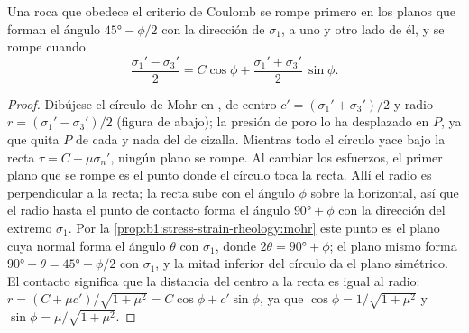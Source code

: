 \begin{theorem}\label{thm:b1:stress-strain-rheology:failure-angle}
Una roca que obedece el criterio de Coulomb se rompe primero en los planos que forman el ángulo $\ang{45} - \phi/2$ con la dirección de $\sigma_1$, a uno y otro
lado de él, y se rompe cuando
\[
  \frac{\sigma_1' - \sigma_3'}{2} = C\cos\phi + \frac{\sigma_1' + \sigma_3'}{2}\,\sin\phi .
\]
\end{theorem}

\begin{proof}
Dibújese el círculo de Mohr en , de centro $c' =
(\sigma_1'+\sigma_3')/2$ y radio $r = (\sigma_1'-\sigma_3')/2$ (figura de abajo); la presión de poro lo ha desplazado en
$P$, ya que quita $P$ de cada  y nada del de cizalla. Mientras todo el círculo yace bajo la recta $\tau = C + \mu\sigma_n'$,
ningún plano se rompe. Al cambiar los esfuerzos, el primer plano que se rompe es el punto donde el círculo toca la recta. Allí el radio es perpendicular a la
recta; la recta sube con el ángulo $\phi$ sobre la horizontal, así que el radio hasta el punto de contacto forma el ángulo $\ang{90} + \phi$ con la dirección del
extremo $\sigma_1$. Por la \cref{prop:b1:stress-strain-rheology:mohr} este punto es el plano cuya normal forma el ángulo $\theta$ con $\sigma_1$, donde
$2\theta = \ang{90} + \phi$; el plano mismo forma $\ang{90} - \theta = \ang{45} - \phi/2$ con $\sigma_1$, y la mitad inferior del círculo da el plano simétrico. El
contacto significa que la distancia del centro a la recta es igual al radio: $r = (C + \mu c')/\sqrt{1+\mu^2} = C\cos\phi + c'\sin\phi$, ya que
$\cos\phi = 1/\sqrt{1+\mu^2}$ y $\sin\phi = \mu/\sqrt{1+\mu^2}$.
\end{proof}

